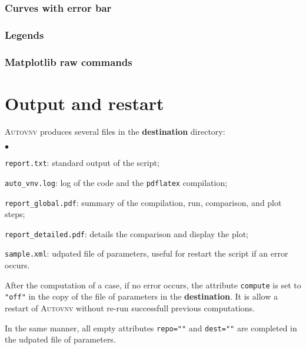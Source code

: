 \documentclass[a4paper,10pt,twoside]{article}
\begin{document}
\subsubsection{Curves with error bar}


\subsubsection{Legends}


\subsubsection{Matplotlib raw commands}


\section{Output and restart}

\textsc{Autovnv} produces several files in the \textbf{destination} directory:
\begin{list}{$\bullet$}{}
\item \texttt{report.txt}: standard output of the script;
\item \texttt{auto\_vnv.log}: log of the code and the \texttt{pdflatex} compilation;
\item \texttt{report\_global.pdf}: summary of the compilation, run, comparison, and plot steps;
\item \texttt{report\_detailed.pdf}: details the comparison and display the plot;
\item \texttt{sample.xml}: udpated file of parameters, useful for restart the script if an error occurs.
\end{list}

After the computation of a case, if no error occurs, the attribute \texttt{compute}
is set to \texttt{"off"} in the copy of the file of parameters in
the \textbf{destination}. It is allow a restart
of \textsc{Autovnv} without re-run successfull previous computations.

In the same manner, all empty attributes \texttt{repo=""} and \texttt{dest=""}
are completed in the udpated file of parameters.

%
\end{document}
